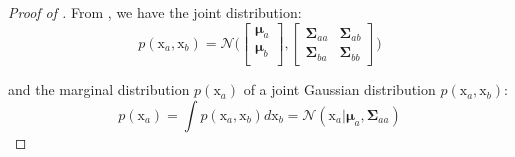 \documentclass{article}
\begin{document}
\begin{proof}[Proof of ]\label{proof:HBM}
From \citep{deisenroth2020mathematics}, we have the joint distribution:
\begin{equation}
  p(\bm{\mathrm{x}}_{a}, \bm{\mathrm{x}}_{b}) = \mathcal{N}\Bigg(
  \begin{bmatrix}
    \bm{\mu}_{a} \\
    \bm{\mu}_{b} \\
  \end{bmatrix},
  \begin{bmatrix}
    \bm{\Sigma}_{aa} & \bm{\Sigma}_{ab}  \\
    \bm{\Sigma}_{ba} & \bm{\Sigma}_{bb}
  \end{bmatrix}
  \Bigg)\label{eq:joint-distrib}
\end{equation}

and the marginal distribution $p(\bm{\mathrm{x}}_{a})$ of a joint Gaussian distribution $p(\bm{\mathrm{x}}_{a}, \bm{\mathrm{x}}_{b})$:
\begin{equation}
  p(\bm{\mathrm{x}}_{a}) = \int p(\bm{\mathrm{x}}_{a}, \bm{\mathrm{x}}_{b}) d \bm{\mathrm{x}}_{b} = \mathcal{N}( \bm{\mathrm{x}}_{a} | \bm{\mu}_{a}, \bm{\Sigma}_{aa})
\end{equation}


\end{proof}
\end{document}
